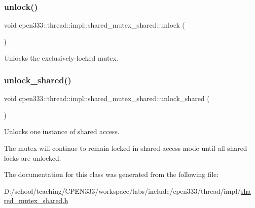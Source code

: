 \subsubsection{\texorpdfstring{unlock()}{unlock()}}
{\footnotesize\ttfamily void cpen333\+::thread\+::impl\+::shared\+\_\+mutex\+\_\+shared\+::unlock (\begin{DoxyParamCaption}{ }\end{DoxyParamCaption})\hspace{0.3cm}{\ttfamily [inline]}}



Unlocks the exclusively-\/locked mutex. 

\mbox{\label{classcpen333_1_1thread_1_1impl_1_1shared__mutex__shared_afba02f4b80ffa817aaa124fa4418465d}} 
\subsubsection{\texorpdfstring{unlock\+\_\+shared()}{unlock\_shared()}}
{\footnotesize\ttfamily void cpen333\+::thread\+::impl\+::shared\+\_\+mutex\+\_\+shared\+::unlock\+\_\+shared (\begin{DoxyParamCaption}{ }\end{DoxyParamCaption})\hspace{0.3cm}{\ttfamily [inline]}}



Unlocks one instance of shared access. 

The mutex will continue to remain locked in shared access mode until all shared locks are unlocked. 

The documentation for this class was generated from the following file\+:\begin{DoxyCompactItemize}
\item 
D\+:/school/teaching/\+C\+P\+E\+N333/workspace/labs/include/cpen333/thread/impl/\hyperlink{thread_2impl_2shared__mutex__shared_8h}{shared\+\_\+mutex\+\_\+shared.\+h}\end{DoxyCompactItemize}
